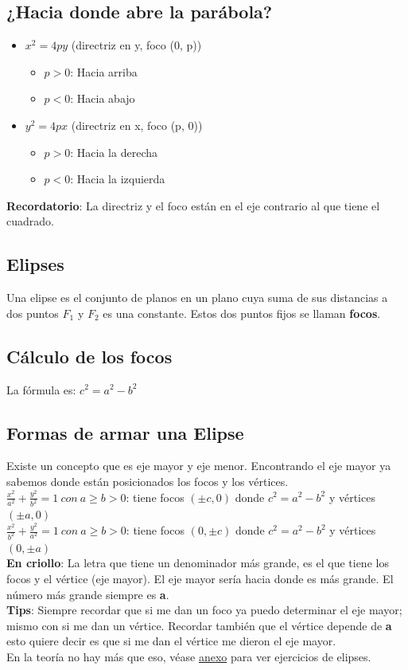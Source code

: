 \documentclass[10pt,a4paper]{article}
\begin{document}
\subsection*{¿Hacia donde abre la parábola?}
\begin{itemize}
    \item $x^{2} = 4py$ (directriz en y, foco (0, p))
    \begin{itemize}
        \item $p > 0$: Hacia arriba
        \item $p < 0$: Hacia abajo
    \end{itemize}
    \item $y^{2} = 4px$ (directriz en x, foco (p, 0))
    \begin{itemize}
        \item $p>0$: Hacia la derecha
        \item $p<0$: Hacia la izquierda
    \end{itemize}
\end{itemize}
\textbf{Recordatorio}: La directriz y el foco están en el eje contrario al que tiene el cuadrado.
\subsection*{Elipses}
Una elipse es el conjunto de planos en un plano cuya suma de sus distancias a dos puntos $F_{1}$ y $F_{2}$ es una constante. Estos dos puntos fijos se llaman \textbf{focos}. 
\subsection*{Cálculo de los focos}
La fórmula es: $c^{2} = a^{2} - b^{2}$
\subsection*{Formas de armar una Elipse}
Existe un concepto que es eje mayor y eje menor. Encontrando el eje mayor ya sabemos donde están posicionados los focos y los vértices. \\
$\frac{x^{2}}{a^{2}} + \frac{y^{2}}{b^{2}} = 1 \ con \ a \ge b > 0$: tiene focos $(\pm c, 0)$ donde $c^{2} = a^{2} - b^{2}$ y vértices $(\pm a, 0)$ \\
$\frac{x^{2}}{b^{2}} + \frac{y^{2}}{a^{2}} = 1 \ con \ a \ge b > 0$: tiene focos $(0,  \pm c)$ donde $c^{2} = a^{2} - b^{2}$ y vértices $(0, \pm a)$ \\
\textbf{En criollo}: La letra que tiene un denominador más grande, es el que tiene los focos y el vértice (eje mayor). El eje mayor sería hacia donde es más grande. El número más grande siempre es \textbf{a}. \\
\textbf{Tips}: Siempre recordar que si me dan un foco ya puedo determinar el eje mayor; mismo con si me dan un vértice. Recordar también que el vértice depende de \textbf{a} esto quiere decir es que si me dan el vértice me dieron el eje mayor. \\
En la teoría no hay más que eso, véase \hyperref[subsec:elipses_ejercicios]{anexo} para ver ejercicios de elipses. \\
\end{document}
